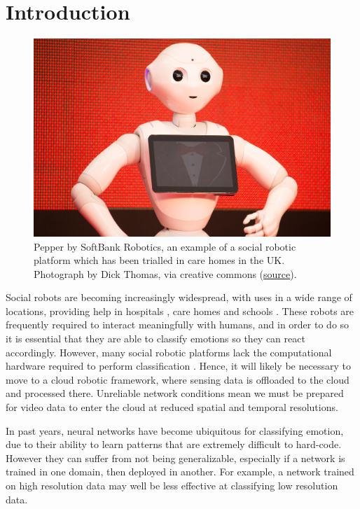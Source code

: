 \documentclass[sigconf]{acmart}
\begin{document}
\section{Introduction}

\begin{figure}
  \includegraphics[width=\linewidth]{care-robot.jpg}
  \caption{Pepper by SoftBank Robotics, an example of a social robotic
  platform which has been trialled in care homes in the UK. Photograph by Dick
  Thomas, via creative commons
  (\href{https://search.creativecommons.org/photos/e802da62-8b2f-4f10-9520-bb6c5a0e03db}{source}).}
  \label{fig:pepper}
\end{figure}

Social robots are becoming increasingly widespread, with uses in a wide range
of locations, providing help in hospitals \cite{moxi}, care homes \cite{ElliQ}
and schools \cite{AV1}. These robots are frequently required to
interact meaningfully with humans, and in order to do so it is essential that
they are able to classify emotions so they can react accordingly. However, many social robotic
platforms lack the computational hardware required to perform classification
\cite{celiktutan18}.
Hence, it will likely be necessary to move to a cloud robotic framework,
where sensing data is offloaded to the cloud and processed there. Unreliable
network conditions mean we must be prepared for video data to enter the cloud
at reduced spatial and temporal resolutions. 

In past years, neural networks have become ubiquitous for classifying emotion,
due to their ability to learn patterns that are extremely difficult to
hard-code.
However they can suffer from not being generalizable, especially if a network
is trained in one domain, then deployed in another. For example, a network
trained on high resolution data may well be less effective at classifying low
resolution data. 
\end{document}
